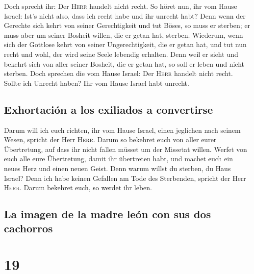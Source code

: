  Doch sprecht ihr: Der \textsc{Herr} handelt nicht recht.
So höret nun, ihr vom Hause Israel: Ist's nicht also, dass ich recht
habe und ihr unrecht habt?  Denn wenn der Gerechte sich
kehrt von seiner Gerechtigkeit und tut Böses, so muss er sterben; er
muss aber um seiner Bosheit willen, die er getan hat, sterben.
 Wiederum, wenn sich der Gottlose kehrt von seiner
Ungerechtigkeit, die er getan hat, und tut nun recht und wohl, der wird
seine Seele lebendig erhalten.  Denn weil er sieht und
bekehrt sich von aller seiner Bosheit, die er getan hat, so soll er
leben und nicht sterben.  Doch sprechen die vom Hause
Israel: Der \textsc{Herr} handelt nicht recht. Sollte ich Unrecht haben?
Ihr vom Hause Israel habt unrecht.

\hypertarget{exhortaciuxf3n-a-los-exiliados-a-convertirse}{%
\subsection{Exhortación a los exiliados a
convertirse}\label{exhortaciuxf3n-a-los-exiliados-a-convertirse}}

 Darum will ich euch richten, ihr vom Hause Israel, einen
jeglichen nach seinem Wesen, spricht der Herr \textsc{Herr}. Darum so
bekehret euch von aller eurer Übertretung, auf dass ihr nicht fallen
müsset um der Missetat willen.  Werfet von euch alle eure
Übertretung, damit ihr übertreten habt, und machet euch ein neues Herz
und einen neuen Geist. Denn warum willst du sterben, du Haus Israel?
 Denn ich habe keinen Gefallen am Tode des Sterbenden,
spricht der Herr \textsc{Herr}. Darum bekehret euch, so werdet ihr
leben.

\hypertarget{la-imagen-de-la-madre-leuxf3n-con-sus-dos-cachorros}{%
\subsection{La imagen de la madre león con sus dos
cachorros}\label{la-imagen-de-la-madre-leuxf3n-con-sus-dos-cachorros}}

\hypertarget{section-18}{%
\section{19}\label{section-18}}

